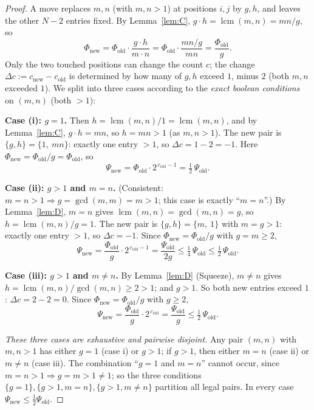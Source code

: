 \documentclass[11pt]{article}
\theoremstyle{plain}
\theoremstyle{definition}
\theoremstyle{remark}
\begin{document}
\begin{proof}
A move replaces $m,n$ (with $m,n>1$) at positions $i,j$ by $g,h$, and leaves
the other $N-2$ entries fixed. By Lemma~\ref{lem:C},
$g\cdot h=\operatorname{lcm}(m,n)=mn/g$, so
\[
\Phi_{\mathrm{new}}=\Phi_{\mathrm{old}}\cdot\frac{g\cdot h}{m\cdot n}
=\Phi_{\mathrm{old}}\cdot\frac{mn/g}{mn}
=\frac{\Phi_{\mathrm{old}}}{g}.
\]
Only the two touched positions can change the count $c$; the change
$\Delta c:= c_{\mathrm{new}}-c_{\mathrm{old}}$ is determined by how many of
$g,h$ exceed $1$, minus $2$ (both $m,n$ exceeded $1$). We split into three
cases according to the \emph{exact boolean conditions} on $(m,n)$ (both
$>1$):

\medskip
\noindent\textbf{Case (i): $g=1$.} Then
$h=\operatorname{lcm}(m,n)/1=\operatorname{lcm}(m,n)$, and by Lemma~\ref{lem:C},
$g\cdot h = mn$, so $h=mn>1$ (as $m,n>1$). The new pair is $\{g,h\}=\{1,\
mn\}$: exactly one entry $>1$, so $\Delta c=1-2=-1$. Here
$\Phi_{\mathrm{new}}=\Phi_{\mathrm{old}}/g=\Phi_{\mathrm{old}}$, so
\[
\Psi_{\mathrm{new}}=\Phi_{\mathrm{old}}\cdot 2^{\,c_{\mathrm{old}}-1}
=\tfrac12\,\Psi_{\mathrm{old}}.
\]

\medskip
\noindent\textbf{Case (ii): $g>1$ and $m=n$.} (Consistent:
$m=n>1\Rightarrow g=\gcd(m,m)=m>1$; this case is exactly ``$m=n$''.) By
Lemma~\ref{lem:D}, $m=n$ gives $\operatorname{lcm}(m,n)= \gcd(m,n)=g$, so
$h=\operatorname{lcm}(m,n)/g=1$. The new pair is $\{g,h\}=\{m,\ 1\}$ with
$m=g>1$: exactly one entry $>1$, so $\Delta c=-1$. Since
$\Phi_{\mathrm{new}}=\Phi_{\mathrm{old}}/g$ with $g=m\ge 2$,
\[
\Psi_{\mathrm{new}}=\frac{\Phi_{\mathrm{old}}}{g}\cdot 2^{\,c_{\mathrm{old}}-1}
=\frac{\Psi_{\mathrm{old}}}{2g}\le\tfrac14\,\Psi_{\mathrm{old}}
\le\tfrac12\,\Psi_{\mathrm{old}}.
\]

\medskip
\noindent\textbf{Case (iii): $g>1$ and $m\ne n$.} By Lemma~\ref{lem:D}
(Squeeze), $m\ne n$ gives $h=\operatorname{lcm}(m,n)/\gcd(m,n)\ge 2>1$; and
$g>1$. So both new entries exceed $1$: $\Delta c=2-2=0$. Since
$\Phi_{\mathrm{new}}=\Phi_{\mathrm{old}}/g$ with $g\ge 2$,
\[
\Psi_{\mathrm{new}}=\frac{\Phi_{\mathrm{old}}}{g}\cdot 2^{\,c_{\mathrm{old}}}
=\frac{\Psi_{\mathrm{old}}}{g}\le\tfrac12\,\Psi_{\mathrm{old}}.
\]

\medskip
\noindent\emph{These three cases are exhaustive and pairwise disjoint.} Any
pair $(m,n)$ with $m,n>1$ has either $g=1$ (case i) or $g>1$; if $g>1$, then
either $m=n$ (case ii) or $m\ne n$ (case iii). The combination ``$g=1$ and
$m=n$'' cannot occur, since $m=n>1\Rightarrow g=m>1\ne 1$; so the three
conditions $\{g=1\},\{g>1,m=n\},\{g>1,m\ne n\}$ partition all legal pairs. In
every case $\Psi_{\mathrm{new}}\le\frac12\Psi_{\mathrm{old}}$.


\end{proof}
\end{document}
